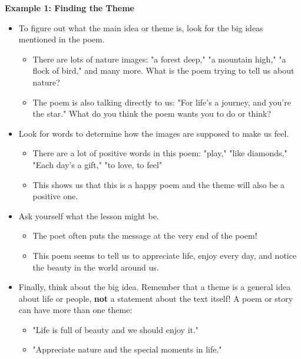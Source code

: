 \documentclass[12pt]{article}
\begin{document}
\begin{tcolorbox}[colframe=black!60, colback=white, 
coltitle=black, colbacktitle=black!15, fonttitle=\bfseries\Large, 
title=Examples, halign title=center, left=10pt, right=10pt, top=10pt, bottom=15pt]

\textbf{Example 1: Finding the Theme}
 \begin{itemize}
     \item To figure out what the main idea or theme is, look for the big ideas mentioned in the poem.
     \begin{itemize}
         \item There are lots of nature images: "a forest deep," "a mountain high," "a flock of bird," and many more. What is the poem trying to tell us about nature?
     \end{itemize}
     \begin{itemize}
         \item The poem is also talking directly to us: "For life's a journey, and you're the star." What do you think the poem wants you to do or think?
     \end{itemize}
 \item Look for words to determine how the images are supposed to make us feel.
 \begin{itemize}
     \item There are a lot of positive words in this poem: "play," "like diamonds," "Each day's a gift," "to love, to feel"
     \item This shows us that this is a happy poem and the theme will also be a positive one.
 \end{itemize}
 \end{itemize}



      

\begin{itemize}
    \item Ask yourself what the lesson might be.
    \begin{itemize}
        \item The poet often puts the message at the very end of the poem!
        \item This poem seems to tell us to appreciate life, enjoy every day, and notice the beauty in the world around us.
    \end{itemize}
\item Finally, think about the big idea. Remember that a theme is a general idea about life or people, \textbf{not} a statement about the text itself! A poem or story can have more than one theme:
\begin{itemize}
    \item "Life is full of beauty and we should enjoy it."
    \item "Appreciate nature and the special moments in life."
\end{itemize}
\end{itemize}

           


 





     \end{tcolorbox}
\end{document}
